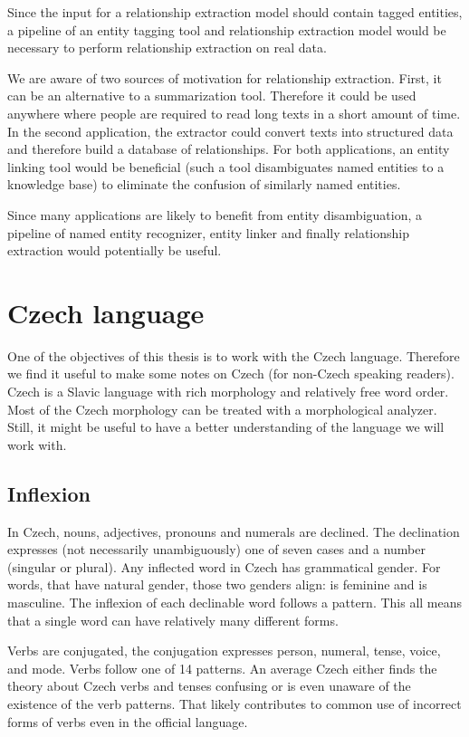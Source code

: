 Since the input for a relationship extraction model should contain tagged entities, a pipeline of an entity tagging tool and relationship extraction model would be necessary to perform relationship extraction on real data. 

We are aware of two sources of motivation for relationship extraction. First, it can be an alternative to a summarization tool. Therefore it could be used anywhere where people are required to read long texts in a short amount of time. In the second application, the extractor could convert texts into structured data and therefore build a database of relationships. For both applications, an entity linking tool would be beneficial (such a tool disambiguates named entities to a knowledge base) to eliminate the confusion of similarly named entities.

\label{sec:relation_extraction_pipeline_proposal}
Since many applications are likely to benefit from entity disambiguation, a pipeline of named entity recognizer, entity linker and finally relationship extraction would potentially be useful.

\section{Czech language}
\label{sec:Czech}
One of the objectives of this thesis is to work with the Czech language. Therefore we find it useful to make some notes on Czech (for non-Czech speaking readers). Czech is a Slavic language with rich morphology and relatively free word order. Most of the Czech morphology can be treated with a morphological analyzer. Still, it might be useful to have a better understanding of the language we will work with.

\subsection{Inflexion}
In Czech, nouns, adjectives, pronouns and numerals are declined. The declination expresses (not necessarily unambiguously) one of seven cases and a number (singular or plural). Any inflected word in Czech has grammatical gender. For words, that have natural gender, those two genders align:   is feminine and   is masculine. The inflexion of each declinable word follows a pattern. This all means that a single word can have relatively many different forms.

Verbs are conjugated, the conjugation expresses person, numeral, tense, voice, and mode. Verbs follow one of 14 patterns. An average Czech either finds the theory about Czech verbs and tenses confusing or is even unaware of the existence of the verb patterns. That likely contributes to common use of incorrect forms of verbs even in the official language.

